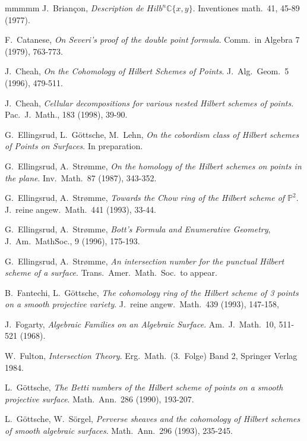 \documentclass[twoside,11pt]{article}
\newcommand{\IC}{{\mathbb C}}
\newcommand{\IP}{{\mathbb P}}
\begin{document}
\begin{thebibliography}{mmmmm}
 J.\ Brian\c{c}on, {\em Description de $Hilb^n\IC\{x,y\}$}. 
Inventiones math.\ 41, 45-89 (1977).

 F.\ Catanese, {\em On Severi's proof of the double point 
formula}. Comm.\ in Algebra 7 (1979), 763-773.

 J.\ Cheah, {\em On the Cohomology of Hilbert Schemes of Points}.
J.\ Alg.\ Geom.\ 5 (1996), 479-511.

 J.\ Cheah, {\em Cellular decompositions for various nested
Hilbert schemes of points}. Pac.\ J.\ Math., 183 (1998), 39-90.

 G.\ Ellingsrud, L.\ G\"ottsche, M.\ Lehn,
{\em On the cobordism class of Hilbert schemes of Points on Surfaces}.
In preparation.

 G.\ Ellingsrud, A.\ Str\o{}mme, {\em On the homology of the 
Hilbert schemes on points in the plane}. Inv.\ Math.\ 87 (1987), 343-352.

 G.\ Ellingsrud, A.\ Str\o{}mme, {\em Towards the Chow ring
of the Hilbert scheme of $\IP^2$}. J.\ reine angew.\ Math.\ 441 (1993), 33-44.

 G.\ Ellingsrud, A.\ Str\o{}mme, {\em Bott's Formula and Enumerative Geometry}, J.\ Am.\ Math\. Soc., 9 (1996), 175-193.

 G.\ Ellingsrud, A.\ Str\o{}mme, {\em An
intersection number for the punctual Hilbert scheme of a surface}. Trans.\
Amer.\ Math.\ Soc.\, to appear.

 
 B.\ Fantechi, L.\ G\"ottsche, {\em The cohomology
ring of the Hilbert scheme of 3 points on a smooth projective variety}. J.\
reine angew.\ Math.\ 439 (1993), 147-158,


 J.\ Fogarty, {\em Algebraic Families on an Algebraic Surface}. Am.\ J.\ Math.\ 10, 511-521 (1968).

\bibitem{Fulton} W.\ Fulton, {\em Intersection Theory}. Erg.\ Math.\ (3.\ Folge) Band 2, Springer Verlag 1984.

\bibitem{Goettsche} L.\ G\"ottsche, {\em The Betti numbers of the Hilbert
scheme of points on a smooth projective surface}. Math.\ Ann.\ 286 (1990), 
193-207.

 L.\ G\"ottsche, W.\ S\"orgel, {\em Perverse sheaves
and the cohomology of Hilbert schemes of smooth algebraic surfaces}. Math.\ 
Ann.\ 296 (1993), 235-245.


\end{thebibliography}
\end{document}
